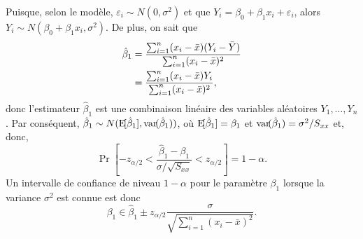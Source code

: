 \begin{solution}{2.11}
    Puisque, selon le modèle, $\varepsilon_i \sim N(0, \sigma^2)$ et
    que $Y_i = \beta_0 + \beta_1 x_i + \varepsilon_i$, alors $Y_i \sim
    N(\beta_0 + \beta_1 x_i, \sigma^2)$. De plus, on sait que
    \begin{align*}
      \hat{\beta}_1
      &= \frac{\sum_{i=1}^n (x_i - \bar{x})(Y_i - \bar{Y})}{%
        \sum_{i=1}^n (x_i - \bar{x})^2} \\
      &= \frac{\sum_{i=1}^n (x_i - \bar{x}) Y_i}{%
        \sum_{i=1}^n (x_i - \bar{x})^2},
    \end{align*}
    donc l'estimateur $\hat{\beta}_1$ est une combinaison linéaire des
    variables aléatoires $Y_1, \dots, Y_n$. Par conséquent,
    $\hat{\beta}_1 \sim N(\mathrm{E}\! [ \hat{\beta}_1 ], \mathrm{var}\! ( \hat{\beta}_1 ))$,
    où $\mathrm{E}\! [ \hat{\beta}_1 ] = \beta_1$ et $\mathrm{var}\! ( \hat{\beta}_1 ) =
    \sigma^2/S_{xx}$ et, donc,
    \begin{displaymath}
      \Pr
      \left[
        -z_{\alpha/2} <
        \frac{\hat{\beta}_1 - \beta_1}{\sigma/\sqrt{S_{xx}}} <
        z_{\alpha/2}
      \right] = 1 - \alpha.
    \end{displaymath}
    Un intervalle de confiance de niveau $1 - \alpha$ pour le
    paramètre $\beta_1$ lorsque la variance $\sigma^2$ est connue est donc
    \begin{displaymath}
      \beta_1 \in \hat{\beta}_1 \pm z_{\alpha/2}
      \frac{\sigma}{\sqrt{\sum_{i=1}^n (x_i - \bar{x})^2}}.
    \end{displaymath}
  
\end{solution}
